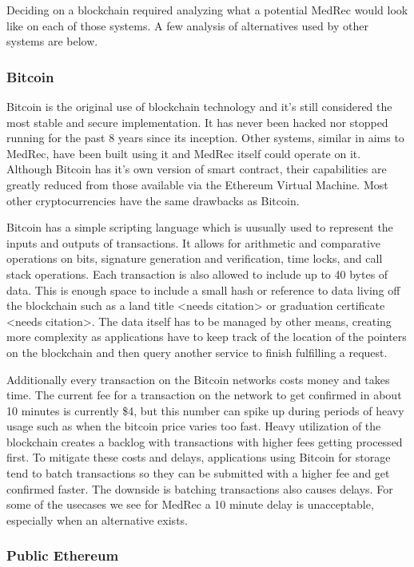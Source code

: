 \documentclass[a4paper]{article}
\begin{document}
Deciding on a blockchain required analyzing what a potential MedRec would look like on each of those systems. A few analysis of alternatives used by other systems are below.

\subsubsection{Bitcoin}

Bitcoin is the original use of blockchain technology and it's still considered the most stable and secure implementation. It has never been hacked nor stopped running for the past 8 years since its inception. Other systems, similar in aims to MedRec, have been built using it and MedRec itself could operate on it. Although Bitcoin has it's own version of smart contract, their capabilities are greatly reduced from those available via the Ethereum Virtual Machine. Most other cryptocurrencies have the same drawbacks as Bitcoin.

Bitcoin has a simple scripting language which is uusually used to represent the inputs and outputs of transactions. It allows for arithmetic and comparative operations on bits, signature generation and verification, time locks, and call stack operations. Each transaction is also allowed to include up to 40 bytes of data. This is enough space to include a small hash or reference to data living off the blockchain such as a land title <needs citation> or graduation certificate <needs citation>. The data itself has to be managed by other means, creating more complexity as applications have to keep track of the location of the pointers on the blockchain and then query another service to finish fulfilling a request.

Additionally every transaction on the Bitcoin networks costs money and takes time. The current fee for a transaction on the network to get confirmed in about 10 minutes is currently \$4, but this number can spike up during periods of heavy usage such as when the bitcoin price varies too fast. Heavy utilization of the blockchain creates a backlog with transactions with higher fees getting processed first. To mitigate these costs and delays, applications using Bitcoin for storage tend to batch transactions so they can be submitted with a higher fee and get confirmed faster. The downside is batching transactions also causes delays. For some of the usecases we see for MedRec a 10 minute delay is unacceptable, especially when an alternative exists.

\subsubsection{Public Ethereum}
\end{document}

